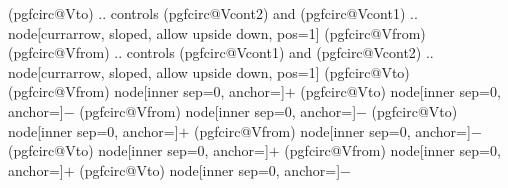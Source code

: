 {	\ifpgf@circuit@europeanvoltage
		\ifpgf@circuit@bipole@voltage@backward
			(pgfcirc@Vto) .. controls (pgfcirc@Vcont2)  and (pgfcirc@Vcont1) .. 
				node[currarrow, sloped,  allow upside down, pos=1] {} 
			(pgfcirc@Vfrom) 
		\else
			(pgfcirc@Vfrom) .. controls (pgfcirc@Vcont1)  and (pgfcirc@Vcont2) ..
				node[currarrow, sloped,  allow upside down, pos=1] {}
			(pgfcirc@Vto) 	
		\fi	
	\else
		\ifpgf@circuit@bipole@voltage@backward
			\ifpgf@circ@oldvoltagedirection
				(pgfcirc@Vfrom) node[inner sep=0, anchor=\pgf@circ@bipole@voltage@label@anchor]{\scriptsize$+$}   
				(pgfcirc@Vto) node[inner sep=0, anchor=\pgf@circ@bipole@voltage@label@anchor]{$-$}
			\else
				(pgfcirc@Vfrom) node[inner sep=0, anchor=\pgf@circ@bipole@voltage@label@anchor]{\scriptsize$-$}   
				(pgfcirc@Vto) node[inner sep=0, anchor=\pgf@circ@bipole@voltage@label@anchor]{$+$}
			\fi
		\else
			\ifpgf@circ@oldvoltagedirection
				(pgfcirc@Vfrom) node[inner sep=0, anchor=\pgf@circ@bipole@voltage@label@anchor]{\scriptsize$-$}   
				(pgfcirc@Vto) node[inner sep=0, anchor=\pgf@circ@bipole@voltage@label@anchor]{$+$}
			\else
				(pgfcirc@Vfrom) node[inner sep=0, anchor=\pgf@circ@bipole@voltage@label@anchor]{\scriptsize$+$}   
				(pgfcirc@Vto) node[inner sep=0, anchor=\pgf@circ@bipole@voltage@label@anchor]{$-$}
			\fi
		\fi	
	\fi
}


\def\pgf@circ@drawvoltagegenerator{
	\ifpgf@circuit@bipole@voltage@below
		coordinate (pgfcirc@Vcont1) at ($(\ctikzvalof{bipole/name}.center) ! \ctikzvalof{voltage/bump a} ! (\ctikzvalof{bipole/name}.-120)$)
		coordinate (pgfcirc@Vcont2) at ($(\ctikzvalof{bipole/name}.center) ! \ctikzvalof{voltage/bump a} ! (\ctikzvalof{bipole/name}.-60)$)
	\else
		coordinate (pgfcirc@Vcont1) at ($ (\ctikzvalof{bipole/name}.center) ! \ctikzvalof{voltage/bump a} ! (\ctikzvalof{bipole/name}.120)$)
		coordinate (pgfcirc@Vcont2) at ($ (\ctikzvalof{bipole/name}.center) ! \ctikzvalof{voltage/bump a} ! (\ctikzvalof{bipole/name}.60)$)
	\fi

	\ifpgf@circuit@europeanvoltage
		\ifpgf@circuit@bipole@voltage@backward
			(pgfcirc@Vcont2)  -- node[currarrow, sloped,  allow upside down, pos=1] {} (pgfcirc@Vcont1)
		\else
			(pgfcirc@Vcont1)  -- node[currarrow, sloped,  allow upside down, pos=1] {} (pgfcirc@Vcont2)
		\fi
	
	\else %
		
	\ifpgf@circuit@bipole@voltageoutsideofsymbol
			\ifpgf@circuit@bipole@voltage@backward
				(pgfcirc@Vcont2)  node {$-$}  (pgfcirc@Vcont1) node {$+$}
			\else
				(pgfcirc@Vcont1)  node {$+$}  (pgfcirc@Vcont2) node {$-$}
			\fi
		\fi
		
	\fi
}

